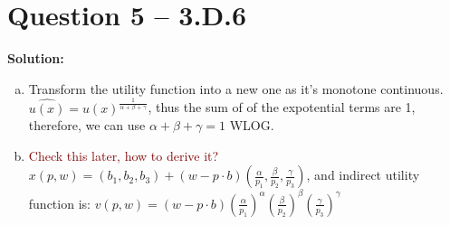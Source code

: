 \documentclass[11pt]{article} %
\begin{document}
\section{Question 5 -- 3.D.6}
\textbf{Solution:}
\begin{enumerate}[(a)]
	\item Transform the utility function into a new one as it's monotone continuous. $\hat{u(x)}=u(x)^{\frac{1}{\alpha+\beta+\gamma}}$, thus the sum of of the expotential terms are 1, therefore, we can use $\alpha+\beta+\gamma=1$ WLOG.
	\item \textcolor{Maroon}{Check this later, how to derive it?} $x(p,w)=(b_1,b_2,b_3)+(w-p\cdot b)(\frac{\alpha}{p_1},\frac{\beta}{p_2},\frac{\gamma}{p_3})$, and indirect utility function is: $v(p,w)=(w-p\cdot b)(\frac{\alpha}{p_1})^\alpha(\frac{\beta}{p_2})^\beta(\frac{\gamma}{p_3})^\gamma$
\end{enumerate}
\end{document}
